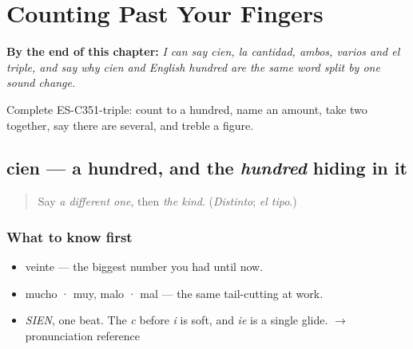 
\chapter{Counting Past Your Fingers}
\label{ch:cien-y-la-cantidad}

\begin{chapteropening}
\textbf{By the end of this chapter:} \emph{I can say cien, la cantidad, ambos, varios and el triple, and say why cien and English hundred are the same word split by one sound change.}

Complete ES-C351-triple: count to a hundred, name an amount, take two together, say there are several, and treble a figure.
\end{chapteropening}

\section[cien]{cien — a hundred, and the \emph{hundred} hiding in it}

\label{lesson:ES-C351-cien}



\begin{quote}
Say \emph{a different one}, then \emph{the kind}. (\emph{Distinto}; \emph{el tipo}.)
\end{quote}

\subsection*{What to know first}
\begin{itemize}
\raggedright
  \item veinte — the biggest number you had until now.
  \item mucho · muy, malo · mal — the same tail-cutting at work.
\end{itemize}

\begin{sounds}
\begin{itemize}
\raggedright
  \item \emph{SIEN}, one beat. The \emph{c} before \emph{i} is soft, and \emph{ie} is a single glide. $\to$ pronunciation reference
\end{itemize}
\end{sounds}

